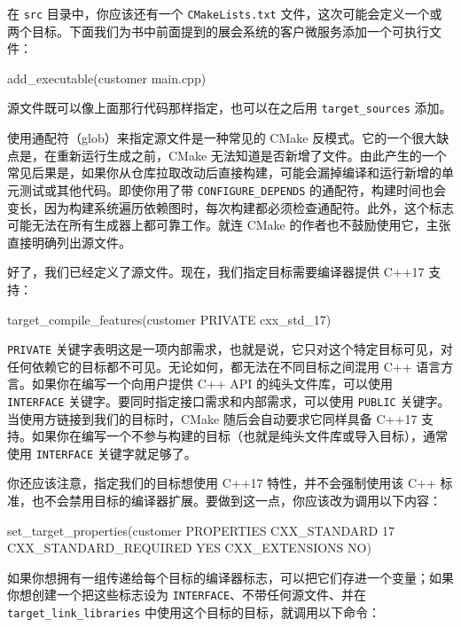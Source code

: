 \label{idx:665}
在 \texttt{src} 目录中，你应该还有一个 \texttt{CMake\allowbreak{}Lists.\allowbreak{}txt} 文件，这次可能会定义一个或两个目标。下面我们为书中前面提到的展会系统的客户微服务添加一个可执行文件：

\begin{codebox}[cmake]
add_executable(customer main.cpp)
\end{codebox}

源文件既可以像上面那行代码那样指定，也可以在之后用 \texttt{target\_\allowbreak{}sources} 添加。

使用通配符（glob）来指定源文件是一种常见的 CMake 反模式。它的一个很大缺点是，在重新运行生成之前，CMake 无法知道是否新增了文件。由此产生的一个常见后果是，如果你从仓库拉取改动后直接构建，可能会漏掉编译和运行新增的单元测试或其他代码。即使你用了带 \texttt{CONFIGURE\_\allowbreak{}DEPENDS} 的通配符，构建时间也会变长，因为构建系统遍历依赖图时，每次构建都必须检查通配符。此外，这个标志可能无法在所有生成器上都可靠工作。就连 CMake 的作者也不鼓励使用它，主张直接明确列出源文件。

好了，我们已经定义了源文件。现在，我们指定目标需要编译器提供 C++17 支持：

\begin{codebox}[cmake]
target_compile_features(customer PRIVATE cxx_std_17)
\end{codebox}

\texttt{PRIVATE} 关键字表明这是一项内部需求，也就是说，它只对这个特定目标可见，对任何依赖它的目标都不可见。无论如何，都无法在不同目标之间混用 C++ 语言方言。如果你在编写一个向用户提供 C++ API 的纯头文件库，可以使用 \texttt{INTERFACE} 关键字。要同时指定接口需求和内部需求，可以使用 \texttt{PUBLIC} 关键字。当使用方链接到我们的目标时，CMake 随后会自动要求它同样具备 C++17 支持。如果你在编写一个不参与构建的目标（也就是纯头文件库或导入目标），通常使用 \texttt{INTERFACE} 关键字就足够了。

你还应该注意，指定我们的目标想使用 C++17 特性，并不会强制使用该 C++ 标准，也不会禁用目标的编译器扩展。要做到这一点，你应该改为调用以下内容：

\begin{codebox}[text]
set_target_properties(customer PROPERTIES
  CXX_STANDARD 17
  CXX_STANDARD_REQUIRED YES
  CXX_EXTENSIONS NO)
\end{codebox}

如果你想拥有一组传递给每个目标的编译器标志，可以把它们存进一个变量；如果你想创建一个把这些标志设为 \texttt{INTERFACE}、不带任何源文件、并在 \texttt{target\_\allowbreak{}link\_\allowbreak{}libraries} 中使用这个目标的目标，就调用以下命令：

